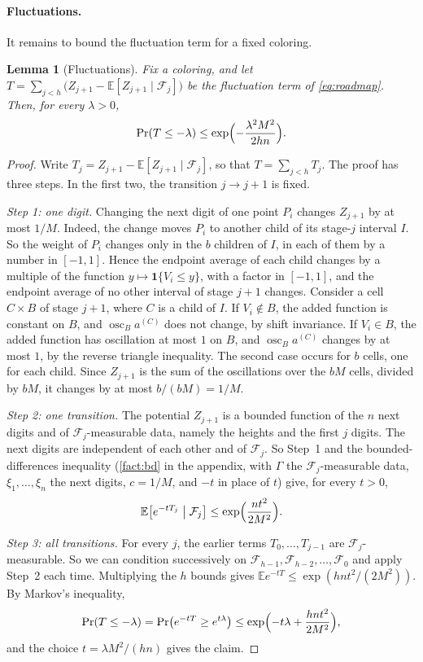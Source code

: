 \documentclass[11pt,letterpaper]{article}
\newtheorem{lemma}[theorem]{Lemma}
\newcommand{\E}{\mathbb{E}}
\newcommand{\F}{\mathcal{F}}
\newcommand{\1}{\mathbf{1}}
\newcommand{\osc}{\operatorname{osc}}
\begin{document}
\paragraph{Fluctuations.}
It remains to bound the fluctuation term for a fixed coloring.

\begin{lemma}[Fluctuations]\label{lem:fluct}
Fix a coloring, and let $T=\sum_{j<h}\bigl(Z_{j+1}-\E[Z_{j+1}\mid\F_j]\bigr)$ be the fluctuation term of \eqref{eq:roadmap}. Then, for every $\lambda>0$,
\begin{equation}\label{eq:fluct}
\Pr(T\le-\lambda)\le\exp\Bigl(-\frac{\lambda^2M^2}{2hn}\Bigr).
\end{equation}
\end{lemma}

\begin{proof}
Write $T_j=Z_{j+1}-\E[Z_{j+1}\mid\F_j]$, so that $T=\sum_{j<h}T_j$. The proof has three steps. In the first two, the transition $j\to j+1$ is fixed.

\emph{Step 1: one digit.} Changing the next digit of one point $P_i$ changes $Z_{j+1}$ by at most $1/M$. Indeed, the change moves $P_i$ to another child of its stage-$j$ interval $I$. So the weight of $P_i$ changes only in the $b$ children of $I$, in each of them by a number in $[-1,1]$. Hence the endpoint average of each child changes by a multiple of the function $y\mapsto\1\{V_i\le y\}$, with a factor in $[-1,1]$, and the endpoint average of no other interval of stage $j+1$ changes. Consider a cell $C\times B$ of stage $j+1$, where $C$ is a child of $I$. If $V_i\notin B$, the added function is constant on $B$, and $\osc_Ba^{(C)}$ does not change, by shift invariance. If $V_i\in B$, the added function has oscillation at most $1$ on $B$, and $\osc_Ba^{(C)}$ changes by at most $1$, by the reverse triangle inequality. The second case occurs for $b$ cells, one for each child. Since $Z_{j+1}$ is the sum of the oscillations over the $bM$ cells, divided by $bM$, it changes by at most $b/(bM)=1/M$.

\emph{Step 2: one transition.} The potential $Z_{j+1}$ is a bounded function of the $n$ next digits and of $\F_j$-measurable data, namely the heights and the first $j$ digits. The next digits are independent of each other and of $\F_j$. So Step~1 and the bounded-differences inequality (\cref{fact:bd} in the appendix, with $\Gamma$ the $\F_j$-measurable data, $\xi_1,\dots,\xi_n$ the next digits, $c=1/M$, and $-t$ in place of $t$) give, for every $t>0$,
\[
\E\bigl[e^{-tT_j}\bigm|\F_j\bigr]\le\exp\Bigl(\frac{nt^2}{2M^2}\Bigr).
\]

\emph{Step 3: all transitions.} For every $j$, the earlier terms $T_0,\dots,T_{j-1}$ are $\F_j$-measurable. So we can condition successively on $\F_{h-1},\F_{h-2},\dots,\F_0$ and apply Step~2 each time. Multiplying the $h$ bounds gives $\E e^{-tT}\le\exp(hnt^2/(2M^2))$. By Markov's inequality,
\[
\Pr(T\le-\lambda)=\Pr\bigl(e^{-tT}\ge e^{t\lambda}\bigr)\le\exp\Bigl(-t\lambda+\frac{hnt^2}{2M^2}\Bigr),
\]
and the choice $t=\lambda M^2/(hn)$ gives the claim.
\end{proof}
\end{document}
